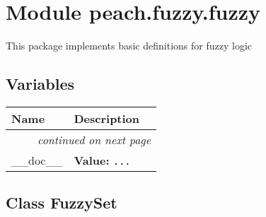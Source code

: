 %
%
%


\section{Module peach.fuzzy.fuzzy}

    \label{peach:fuzzy:fuzzy}

This package implements basic definitions for fuzzy logic


  \subsection{Variables}

\begin{longtable}{|p{}|p{}|l}
\cline{1-2}
\cline{1-2} \centering \textbf{Name} & \centering \textbf{Description}& \\
\cline{1-2}
\endhead\cline{1-2}\multicolumn{3}{r}{\small\textit{continued on next page}}\\\endfoot\cline{1-2}
\endlastfoot\raggedright \_\-\_\-d\-o\-c\-\_\-\_\- & \raggedright \textbf{Value:} 
{\tt \texttt{...}}&\\
\cline{1-2}
\end{longtable}



\subsection{Class FuzzySet}

